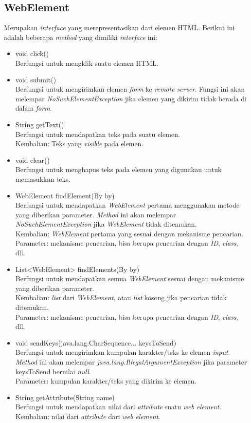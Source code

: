\subsection{WebElement}
\label{subsec:webelement}  
Merupakan \textit{interface} yang  merepresentasikan dari elemen HTML. Berikut ini adalah beberapa \textit{method} yang dimiliki \textit{interface} ini:
\begin{itemize}
\item void click()\\
Berfungsi untuk mengklik suatu elemen HTML.
\item void submit()\\
Berfungsi untuk mengirimkan elemen \textit{form} ke \textit{remote server}. Fungsi ini akan melempar \textit{NoSuchElementException} jika elemen yang dikirim tidak berada di dalam \textit{form}. 
\item String getText()\\
Berfungsi untuk mendapatkan teks pada suatu elemen.\\
Kembalian: Teks yang \textit{visible} pada elemen.

\item void clear()\\
Berfungsi untuk menghapus teks pada elemen yang digunakan untuk memasukkan teks.
\item WebElement findElement(By by)\\
Berfungsi untuk mendapatkan \textit{WebElement} pertama menggunakan metode yang diberikan parameter. \textit{Method} ini akan melempar \textit{NoSuchElementException} jika \textit{WebElement} tidak ditemukan.\\
Kembalian: \textit{WebElement} pertama yang sesuai dengan mekanisme pencarian.\\
Parameter: mekanisme pencarian, bisa berupa pencarian dengan \textit{ID}, \textit{class}, dll.

\item List<WebElement> findElements(By by)\\
Berfungsi untuk mendapatkan semua \textit{WebElement} sesuai dengan mekanisme yang diberikan parameter.\\
Kembalian: \textit{list} dari \textit{WebElement}, atau \textit{list} kosong jika pencarian tidak ditemukan.\\
Parameter: mekanisme pencarian, bisa berupa pencarian dengan \textit{ID}, \textit{class}, dll.
\item void sendKeys(java.lang.CharSequence... keysToSend)\\
Berfungsi untuk mengirimkan kumpulan karakter/teks ke elemen \textit{input}. \textit{Method} ini akan melempar \textit{java.lang.IllegalArgumentException} jika parameter keysToSend bernilai \textit{null}.\\
Parameter: kumpulan karakter/teks yang dikirim ke elemen.

\item String getAttribute(String name)\\
Berfungsi untuk mendapatkan nilai dari \textit{attribute} suatu \textit{web element}.\\
Kembalian: nilai dari \textit{attribute} dari \textit{web element}.
\end{itemize} 

